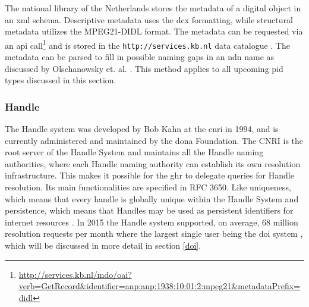 The national library of the Netherlands stores the metadata of a digital object in an \gls{xml} schema. Descriptive metadata uses the \gls{dcx} formatting, while structural metadata utilizes the MPEG21-DIDL format. The metadata can be requested via an \gls{api} call\footnote{\url{http://services.kb.nl/mdo/oai?verb=GetRecord&identifier=anp:anp:1938:10:01:2:mpeg21&metadataPrefix=didl}} and is stored in the 
\texttt{http://services.kb.nl} data catalogue \cite{kb-urn}. The metadata can be parsed to fill in possible naming gaps in an \gls{ndn} name as discussed by Olschanowsky et. al. \cite{ndn-clim}. This method applies to all upcoming \gls{pid} types discussed in this section.

\subsubsection{Handle}\label{hndl}
The Handle system was developed by Bob Kahn at the \gls{cnri} in 1994, and is currently administered and maintained by the \gls{dona} Foundation. The CNRI is the root server of the Handle System and maintains all the Handle naming authorities, where each Handle naming authority can establish its own resolution infrastructure. This makes it possible for the \gls{ghr} to delegate queries for Handle resolution. 
Its main functionalities are specified in RFC 3650. Like uniqueness, which means that every handle is globally unique within the Handle System and persistence, which means that Handles may be used as persistent identifiers for internet resources \cite{rfc3650}. In 2015 the Handle system supported, on average, 68 million resolution requests per month where the largest single user being the \gls{doi} system \cite{hdl-us}, which will be discussed in more detail in section \ref{doi}. 

